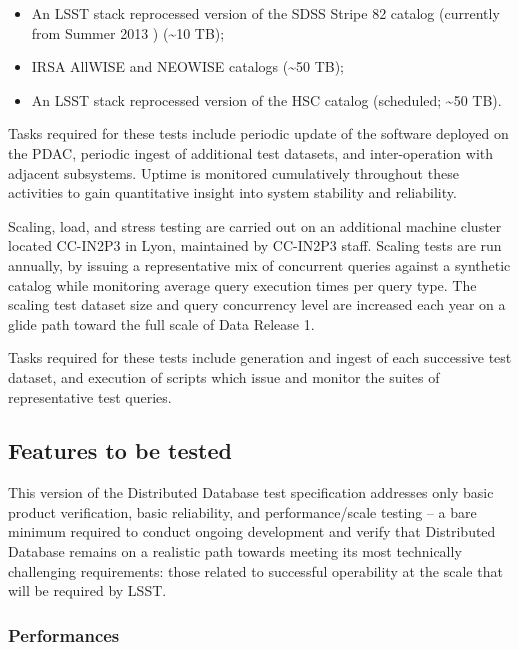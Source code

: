 \documentclass[DM,STS,toc]{lsstdoc}
\def\product{Distributed Database}
\begin{document}
\begin{itemize}
  \item{An LSST stack reprocessed version of the SDSS Stripe 82 catalog (currently from Summer 2013 ) ({\textasciitilde{}}10 TB);}
  \item{IRSA AllWISE and NEOWISE catalogs ({\textasciitilde{}}50 TB);}
  \item{An LSST stack reprocessed version of the HSC catalog (scheduled; {\textasciitilde{}}50 TB).}
\end{itemize}

Tasks required for these tests include periodic update of the software deployed on the PDAC,
periodic ingest of additional test datasets, and inter-operation with adjacent subsystems.  Uptime
is monitored cumulatively throughout these activities to gain quantitative insight into system
stability and reliability.

Scaling, load, and stress testing are carried out on an additional machine cluster located
CC-IN2P3 in Lyon, maintained by CC-IN2P3 staff. Scaling tests are run annually, by issuing
a representative mix of concurrent queries against a synthetic catalog while monitoring
average query execution times per query type.  The scaling test dataset size and query
concurrency level are increased each year on a glide path toward the full scale of Data Release 1.

Tasks required for these tests include generation and ingest of each successive test dataset, and
execution of scripts which issue and monitor the suites of representative test queries.

\subsection{Features to be tested}
\label{sec:feat2test}

This version of the \product{} test specification addresses only basic product verification, basic
reliability, and performance/scale testing -- a bare minimum required to conduct ongoing development
and verify that \product{} remains on a realistic path towards meeting its most technically challenging
requirements: those related to successful operability at the scale that will be required by LSST.


\subsubsection{Performances}
\end{document}
